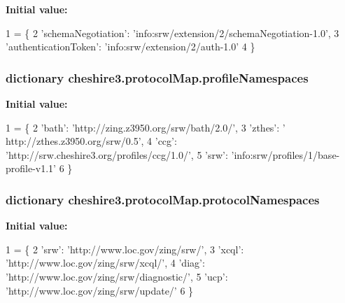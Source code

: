 {\bfseries Initial value\-:}
\begin{DoxyCode}
1 = \{
2   \textcolor{stringliteral}{'schemaNegotiation'}: \textcolor{stringliteral}{'info:srw/extension/2/schemaNegotiation-1.0'},
3   \textcolor{stringliteral}{'authenticationToken'}: \textcolor{stringliteral}{'info:srw/extension/2/auth-1.0'}
4 \}
\end{DoxyCode}
\hypertarget{namespacecheshire3_1_1protocol_map_ac81c199d7b9c74b5d7ecf3dc0be2c5d3}{
\subsubsection[{profile\-Namespaces}]{\setlength{\rightskip}{0pt plus 5cm}dictionary cheshire3.\-protocol\-Map.\-profile\-Namespaces}}\label{namespacecheshire3_1_1protocol_map_ac81c199d7b9c74b5d7ecf3dc0be2c5d3}
{\bfseries Initial value\-:}
\begin{DoxyCode}
1 = \{
2   \textcolor{stringliteral}{'bath'}: \textcolor{stringliteral}{'http://zing.z3950.org/srw/bath/2.0/'},
3   \textcolor{stringliteral}{'zthes'}: \textcolor{stringliteral}{' http://zthes.z3950.org/srw/0.5'},
4   \textcolor{stringliteral}{'ccg'}: \textcolor{stringliteral}{'http://srw.cheshire3.org/profiles/ccg/1.0/'},
5   \textcolor{stringliteral}{'srw'}: \textcolor{stringliteral}{'info:srw/profiles/1/base-profile-v1.1'}
6 \}
\end{DoxyCode}
\hypertarget{namespacecheshire3_1_1protocol_map_ae8833cdcbbb8bd691578e66e1078e539}{
\subsubsection[{protocol\-Namespaces}]{\setlength{\rightskip}{0pt plus 5cm}dictionary cheshire3.\-protocol\-Map.\-protocol\-Namespaces}}\label{namespacecheshire3_1_1protocol_map_ae8833cdcbbb8bd691578e66e1078e539}
{\bfseries Initial value\-:}
\begin{DoxyCode}
1 = \{
2   \textcolor{stringliteral}{'srw'}: \textcolor{stringliteral}{'http://www.loc.gov/zing/srw/'},
3   \textcolor{stringliteral}{'xcql'}: \textcolor{stringliteral}{'http://www.loc.gov/zing/srw/xcql/'},
4   \textcolor{stringliteral}{'diag'}: \textcolor{stringliteral}{'http://www.loc.gov/zing/srw/diagnostic/'},
5   \textcolor{stringliteral}{'ucp'}: \textcolor{stringliteral}{'http://www.loc.gov/zing/srw/update/'}
6 \}
\end{DoxyCode}
